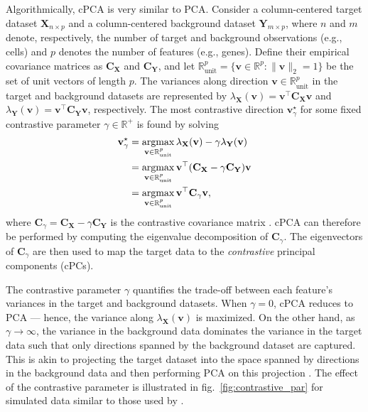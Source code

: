 Algorithmically, cPCA is very similar to PCA. Consider a column-centered target dataset $\mathbf{X}_{n \times p}$ and a column-centered background dataset $\mathbf{Y}_{m \times p}$, where $n$ and $m$ denote, respectively, the number of target and background observations (e.g., cells) and $p$ denotes the number of features (e.g., genes). Define their empirical covariance matrices as $\mathbf{C_X}$ and $\mathbf{C_Y}$, and let $\mathbb{R}_{\text{unit}}^p=\{\mathbf{v} \in \mathbb{R}^p: \lVert\mathbf{v}\rVert_2 = 1\}$ be the set of unit vectors of length $p$. The variances along direction $\mathbf{v} \in \mathbb{R}_{\text{unit}}^p$ in the target and background datasets are represented by $\lambda_{\mathbf{X}}(\mathbf{v}) = \mathbf{v}^\top\mathbf{C_X}\mathbf{v}$ and $\lambda_{\mathbf{Y}}(\mathbf{v}) = \mathbf{v}^\top\mathbf{C_Y}\mathbf{v}$, respectively. The most contrastive direction $\mathbf{v}^{\star}_\gamma$ for some fixed contrastive parameter $\gamma \in \mathbb{R}^+$ is found by solving
\begin{equation}
    \begin{aligned}
  \mathbf{v}^{\star}_\gamma & = \operatorname*{argmax}_{\mathbf{v} \in \mathbb{R}_{\text{unit}}^p}
  \lambda_{\mathbf{X}}(\mathbf{v})-
    \gamma \lambda_{\mathbf{Y}}(\mathbf{v}) \\
  & = \operatorname*{argmax}_{\mathbf{v} \in \mathbb{R}_{\text{unit}}^p}
    \mathbf{v}^\top(\mathbf{C_X} - \gamma\mathbf{C_Y})\mathbf{v} \\
  & = \operatorname*{argmax}_{\mathbf{v} \in \mathbb{R}_{\text{unit}}^p}
    \mathbf{v}^\top\mathbf{C}_{\gamma}\mathbf{v},
\end{aligned}
\end{equation}
where $\mathbf{C}_{\gamma} =  \mathbf{C_X} - \gamma\mathbf{C_Y}$ is the contrastive covariance matrix \cite{Abid2018}. cPCA can therefore be performed by computing the eigenvalue decomposition of $\mathbf{C}_{\gamma}$. The eigenvectors of $\mathbf{C}_{\gamma}$ are then used to map the target data to the \textit{contrastive} principal components (cPCs).

The contrastive parameter $\gamma$ quantifies the trade-off between each feature's variances in the target and background datasets. When $\gamma = 0$, cPCA reduces to PCA --- hence, the variance along $\lambda_{\mathbf{X}}(\mathbf{v})$ is maximized. On the other hand, as $\gamma \rightarrow \infty$, the variance in the background data dominates the variance in the target data such that only directions spanned by the background dataset are captured. This is akin to projecting the target dataset into the space spanned by directions in the background data and then performing PCA on this projection \cite{Abid2018}. The effect of the contrastive parameter is illustrated in fig.~\ref{fig:contrastive_par} for simulated data similar to those used by \citet{Abid2018}.

